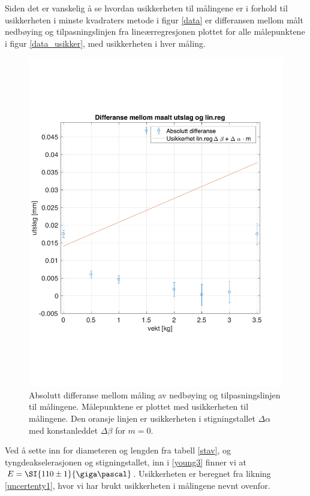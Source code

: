\documentclass[%
 reprint,
nofootinbib,
aps,
]{revtex4-1}
\begin{document}
Siden det er vanskelig å se hvordan usikkerheten til målingene er i forhold til usikkerheten i minste kvadraters metode i figur \vref{data} er differansen mellom målt nedbøying og tilpasningslinjen fra lineærregresjonen plottet for alle målepunktene i figur \vref{data_usikker}, med usikkerheten i hver måling.
\begin{figure}[h!]
  \centering
  \includegraphics[scale=0.40]{usikkerhet_c.pdf}
  \caption{Absolutt differanse mellom måling av nedbøying og tilpasningslinjen til målingene. Målepunktene er plottet med usikkerheten til målingene. Den oransje linjen er usikkerheten i stigningstallet $\Delta \alpha$ med konstanleddet $\Delta \beta$ for $m=0$.}
  \label{data_usikker}
\end{figure}
Ved å sette inn for diameteren og lengden fra tabell \vref{stav}, og tyngdeakselerasjonen og stigningstallet, inn i \eqref{young3} finner vi at $E=\SI{110\pm1}{\giga\pascal}$. Usikkerheten er beregnet fra likning \eqref{uncertenty1}, hvor vi har brukt usikkerheten i målingene nevnt ovenfor.
\end{document}

